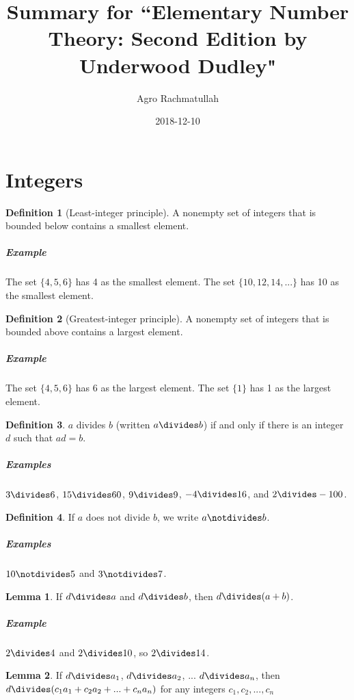 \documentclass{article}
\title{Summary for ``Elementary Number Theory: Second Edition by Underwood Dudley"}
\date{2018-12-10}
\author{Agro Rachmatullah}
\theoremstyle{definition} %
\theoremstyle{definition}
\theoremstyle{definition}
\newtheorem{lemma}{Lemma}[section]
\theoremstyle{definition}
\newtheorem{definition}{Definition}[section]
\begin{document}
  \maketitle
  
  \newpage
  \section{Integers}
  
  \begin{definition}[Least-integer principle]
  A nonempty set of integers that is bounded below contains a smallest element.
  \end{definition}
  
  \subparagraph{Example} The set $\{4, 5, 6\}$ has 4 as the smallest element. The set $\{10, 12, 14, ...\}$ has 10 as the smallest element.
  
  \begin{definition}[Greatest-integer principle]
  A nonempty set of integers that is bounded above contains a largest element.
  \end{definition}
  
  \subparagraph{Example} The set $\{4, 5, 6\}$ has 6 as the largest element. The set $\{1\}$ has 1 as the largest element.
  
  \begin{definition}
  $a$ divides $b$ (written $a \divides b$) if and only if there is an integer $d$ such that $ad = b$.
  
  \subparagraph{Examples} $3 \divides 6$, $15 \divides 60$, $9 \divides 9$, $-4 \divides 16$, and $2 \divides -100$.
  \end{definition}
  
  \begin{definition}
  If $a$ does not divide $b$, we write $a \notdivides b$.
  
  \subparagraph{Examples} $10 \notdivides 5$ and $3 \notdivides 7$.
  \end{definition}
  
  \begin{lemma}
    If $d \divides a$ and $d \divides b$, then $d \divides (a + b)$.
  \end{lemma}
  
  \subparagraph{Example} $2 \divides 4$ and $2 \divides 10$, so $2 \divides 14$.
  
  \begin{lemma}
    If $d \divides a_1$, $d \divides a_2$, ... $d \divides a_n$, then $d \divides (c_1a_1 + c_2a_2 + ... + c_na_n)$ for any integers $c_1, c_2, ..., c_n$
  \end{lemma}
  
\end{document}
